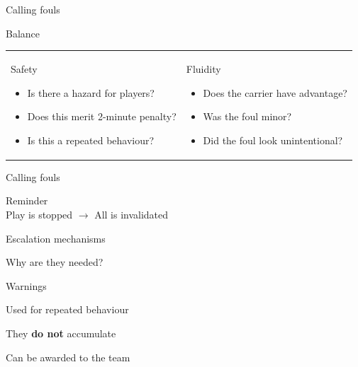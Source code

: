 \documentclass{beamer}
\begin{document}
    \begin{frame}{Calling fouls}
        \begin{center}
            Balance
        \end{center}
        \begin{tabular}{ll}
            \parbox{0.5\textwidth}
            {
                \begin{center}
                    Safety
                \end{center}
                \begin{itemize}
                    \item Is there a hazard for players?
                    \item Does this merit 2-minute penalty?
                    \item Is this a repeated behaviour?
                \end{itemize}
            }
            &
            \parbox{0.5\textwidth}
            {
                \begin{center}
                    Fluidity
                \end{center}
                \begin{itemize}
                    \item Does the carrier have advantage?
                    \item Was the foul minor?
                    \item Did the foul look unintentional?
                \end{itemize}
            }
        \end{tabular}
    \end{frame}

    \begin{frame}{Calling fouls}
        \begin{center}
            Reminder \\
            Play is stopped $\rightarrow$ All is invalidated
        \end{center}
    \end{frame}

    \begin{frame}{Escalation mechanisms}
        \begin{center}
            Why are they needed?
        \end{center}
    \end{frame}

    \begin{frame}{Warnings}
        \begin{center}
            Used for repeated behaviour

            They \textbf{do not} accumulate

            Can be awarded to the team
        \end{center}
    \end{frame}
\end{document}

